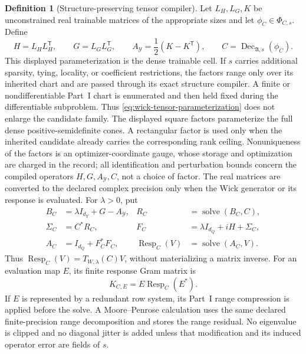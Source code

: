 \documentclass[11pt]{article}
\numberwithin{section}{part}
\theoremstyle{plain}
\theoremstyle{definition}
\newtheorem{definition}[definition]{Definition}
\theoremstyle{remark}
\begin{document}
\begin{definition}[Structure-preserving tensor compiler]
\label{def:wick-tensor-compiler}
Let \(L_H,L_G,K\) be unconstrained real trainable matrices of the appropriate
sizes and let \(\phi_C\in\Phi_{C,s}\).  Define
\begin{equation}
 \label{eq:wick-tensor-parameterization}
 H=L_HL_H^{\mathsf T},\qquad
 G=L_GL_G^{\mathsf T},\qquad
 A_{\mathcal Y}=\frac12(K-K^{\mathsf T}),\qquad
 C=\operatorname{Dec}_{\mathfrak A,s}(\phi_C).
\end{equation}
This displayed parameterization is the dense trainable cell.  If \(s\)
carries additional sparsity, tying, locality, or coefficient restrictions,
the factors range only over its inherited chart and are passed through its
exact structure compiler.  A finite or nondifferentiable Part~I chart is
enumerated and then held fixed during the differentiable subproblem.  Thus
\eqref{eq:wick-tensor-parameterization} does not enlarge the candidate family.
The displayed square factors parameterize the full dense positive-semidefinite
cones.  A rectangular factor is used only when the inherited candidate
already carries the corresponding rank ceiling.  Nonuniqueness of the
factors is an optimizer-coordinate gauge, whose storage and optimization are
charged in the record; all identification and perturbation bounds concern
the compiled operators \(H,G,A_{\mathcal Y},C\), not a choice of factor.
The real matrices are converted to the declared complex precision only when
the Wick generator or its response is evaluated.  For \(\lambda>0\), put
\begin{align}
 B_C&=\lambda I_{d_Y}+G-A_{\mathcal Y},
 &R_C&=\operatorname{solve}(B_C,C),
 \label{eq:wick-empirical-complement-solve}\\
 \Sigma_C&=C^*R_C,
 &F_C&=\lambda I_{d_Q}+iH+\Sigma_C,
 \label{eq:wick-empirical-self-energy}\\
 A_C&=I_{d_Q}+F_C^*F_C,
 &\operatorname{Resp}_C(V)&=\operatorname{solve}(A_C,V).
 \label{eq:wick-empirical-response-solve}
\end{align}
Thus \(\operatorname{Resp}_C(V)=T_{W,\lambda}(C)V\), without materializing a
matrix inverse.  For an evaluation map \(E\), its finite response Gram matrix
is
\begin{equation}
 \label{eq:wick-empirical-gram-solve}
 K_{C,E}=E\operatorname{Resp}_C(E^*).
\end{equation}
If \(E\) is represented by a redundant row system, its Part~I range
compression is applied before the solve.  A Moore--Penrose calculation uses
the same declared finite-precision range decomposition and stores the range
residual.  No eigenvalue is clipped and no diagonal jitter is added unless
that modification and its induced operator error are fields of \(s\).


\end{definition}
\end{document}
